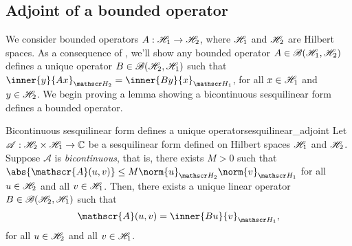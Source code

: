 \subsection{Adjoint of a bounded operator}
We consider bounded operators \(A : \mathscr{H}_1 \to \mathscr{H}_2\), where \(\mathscr{H}_1\) and \(\mathscr{H}_2\) are Hilbert spaces. As a consequence of , we'll show any bounded operator \(A \in \mathscr{B}(\mathscr{H}_1, \mathscr{H}_2)\) defines a unique operator \(B \in \mathscr{B}(\mathscr{H}_2, \mathscr{H}_1)\) such that \(\inner{y}{Ax}_{\hilbert_2} = \inner{By}{x}_{\hilbert_1}\), for all \(x \in \mathscr{H}_1\) and \(y \in \mathscr{H}_2\). We begin proving a lemma showing a bicontinuous sesquilinear form defines a bounded operator.
\begin{lemma}{Bicontinuous sesquilinear form defines a unique operator}{sesquilinear_adjoint}
    Let \(\mathscr{A} : \mathscr{H}_2 \times \mathscr{H}_1 \to \mathbb{C}\) be a sesquilinear form defined on Hilbert spaces \(\mathscr{H}_1\) and \(\mathscr{H}_2\). Suppose \(\mathscr{A}\) is \emph{bicontinuous}, that is, there exists \(M > 0\) such that \(\abs{\mathscr{A}(u,v)} \leq M\norm{u}_{\hilbert_2} \norm{v}_{\hilbert_1}\) for all \(u \in \mathscr{H}_2\) and all \(v \in \mathscr{H}_1\). Then, there exists a unique linear operator \(B \in \mathscr{B}(\mathscr{H}_2, \mathscr{H}_1)\) such that
    \begin{equation*}
        \mathscr{A}(u,v) = \inner{Bu}{v}_{\hilbert_1},
    \end{equation*}
    for all \(u \in \mathscr{H}_2\) and all \(v \in \mathscr{H}_1\).
\end{lemma}
